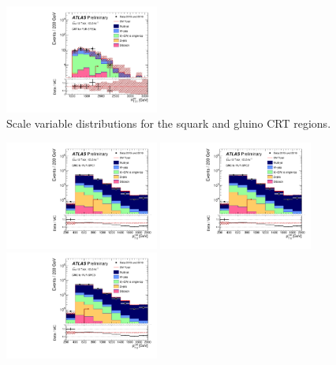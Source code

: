 \begin{figure}[tbp]
\begin{center}
\includegraphics[width=0.45\textwidth]{figures/ATLAS-CONF-2016-078_INT/N-1Plots/AtlasStyle/Preliminary/CRT_SRJigsawSRS3a_LastCut_CRT_minusone}
\end{center}
\caption{Scale variable distributions for the squark and gluino CRT regions.}
\label{fig:CRT_SRJigsawSRG1a_LastCut_CRT_minusone}
\end{figure}

\begin{figure}[tbp]
\begin{center}
\includegraphics[width=0.45\textwidth]{figures/ATLAS-CONF-2016-078_INT/N-1Plots/AtlasStyle/Preliminary/CRQ_SRJigsawSRC1_LastCut_CRQ_minusone}
\includegraphics[width=0.45\textwidth]{figures/ATLAS-CONF-2016-078_INT/N-1Plots/AtlasStyle/Preliminary/CRQ_SRJigsawSRC2_LastCut_CRQ_minusone}
\includegraphics[width=0.45\textwidth]{figures/ATLAS-CONF-2016-078_INT/N-1Plots/AtlasStyle/Preliminary/CRQ_SRJigsawSRC3_LastCut_CRQ_minusone}

\end{center}
\end{figure}
